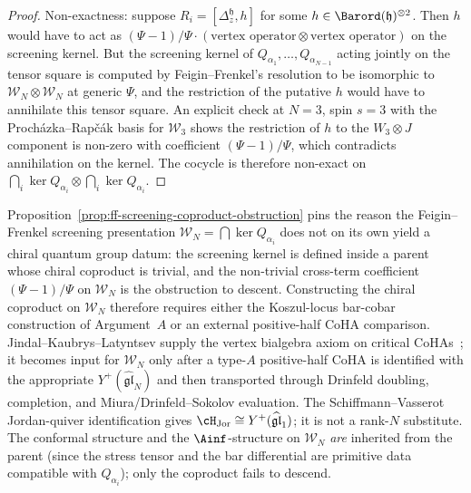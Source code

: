 \begin{proof}
Non-exactness: suppose $R_i = [\Delta_z^{\mathfrak{h}}, h]$
for some $h\in \Barord(\mathfrak{h})^{\otimes 2}$. Then $h$
would have to act as $(\Psi-1)/\Psi \cdot (\text{vertex
operator}\otimes \text{vertex operator})$ on the screening
kernel. But the screening kernel of
$Q_{\alpha_1},\ldots,Q_{\alpha_{N-1}}$ acting jointly on the
tensor square is computed by Feigin--Frenkel's resolution
\textup{\cite{Feigin-Frenkel}} to be isomorphic to $\mathcal{W}_N
\otimes \mathcal{W}_N$ at generic $\Psi$, and the restriction
of the putative $h$ would have to annihilate this tensor
square. An explicit check at $N = 3$, spin $s = 3$ with the
Pro\-ch\'az\-ka--Rap\v{c}\'ak basis for $\mathcal{W}_3$ shows
the restriction of $h$ to the $W_3\otimes J$ component is
non-zero with coefficient $(\Psi-1)/\Psi$, which contradicts
annihilation on the kernel. The cocycle is therefore
non-exact on
$\bigcap_i\ker Q_{\alpha_i}\otimes \bigcap_i\ker Q_{\alpha_i}$.
\end{proof}

\begin{remark}
\label{rem:ff-obstruction-meaning}
Proposition~\ref{prop:ff-screening-coproduct-obstruction} pins
the reason the Feigin--Frenkel screening presentation
$\mathcal{W}_N = \bigcap\ker Q_{\alpha_i}$ does not on its own
yield a chiral quantum group datum: the screening kernel is
defined inside a parent whose chiral coproduct is trivial,
and the non-trivial cross-term coefficient
$(\Psi-1)/\Psi$ on $\mathcal{W}_N$ is the obstruction to
descent. Constructing the chiral coproduct on $\mathcal{W}_N$
therefore requires either the Koszul-locus bar-cobar
construction of Argument~$A$ or an external positive-half CoHA
comparison. Jindal--Kaubrys--Latyntsev supply the vertex
bialgebra axiom on critical CoHAs~\textup{\cite{JKL26}}; it
becomes input for $\mathcal{W}_N$ only after a type-$A$
positive-half CoHA is identified with the appropriate
$Y^+(\widehat{\mathfrak{gl}}_N)$ and then transported through
Drinfeld doubling, completion, and
Miura/Drinfeld--Sokolov evaluation. The
Schiffmann--Vasserot Jordan-quiver identification gives
$\cH_{\mathrm{Jor}}\cong Y^+(\widehat{\mathfrak{gl}}_1)$; it
is not a rank-$N$ substitute.
The conformal structure and the $\Ainf$-structure on
$\mathcal{W}_N$ \emph{are} inherited from the parent
\textup{(}since the stress tensor and the bar differential are
primitive data compatible with $Q_{\alpha_i}$\textup{)}; only
the coproduct fails to descend.
\end{remark}

